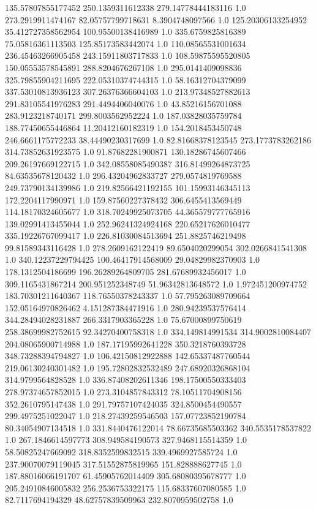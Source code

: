 135.57807855177452	250.1359311612338	279.14778444183116	1.0
273.2919911474167	82.05757799718631	8.3904748097566	1.0
125.20306133254952	35.412727358562954	100.95500138416989	1.0
335.6759825816389	75.05816361113503	125.85173583442074	1.0
110.08565531001634	236.45463266905458	243.15911803717833	1.0
108.59875595520805	150.05553578545891	288.8204676267108	1.0
295.0141409098836	325.79855904211695	222.05310374744315	1.0
58.16312704379099	337.53010813936123	307.26376366604103	1.0
213.97348527882613	291.83105541976283	291.4494406040076	1.0
43.85216156701088	283.9123218740171	299.8003562952224	1.0
187.03828035759784	188.77450655446864	11.20412160182319	1.0
154.2018453450748	246.6661175772233	38.44490230317699	1.0
82.81668378123545	273.1773783262186	314.73852631923575	1.0
91.87682281900871	130.18286745607466	209.26197669122715	1.0
342.08558085490387	316.81499264873725	84.63535678120432	1.0
296.43204962833727	279.0574819769588	249.73790134139986	1.0
219.82566421192155	101.15993146345113	172.2204117990971	1.0
159.87560227378432	306.6455413569449	114.18170324605677	1.0
318.70249925073705	44.365579777765916	139.02991413455044	1.0
252.96241324924168	220.65217626010477	335.19226767099417	1.0
226.81030084513694	251.8825746219498	99.81589343116428	1.0
278.2609162122419	89.6504020299054	302.0266841541308	1.0
340.12237229794425	100.46417914568009	29.04829982370903	1.0
178.1312504186699	196.26289264809705	281.67689932456017	1.0
309.1165431867214	200.951252348749	51.96342813648572	1.0
1.972451200974752	183.70301211640367	118.76550378243337	1.0
57.795263089709664	152.05164970826462	4.151287384471916	1.0
280.94239537576414	344.28494028231887	266.3317903365228	1.0
75.67000899750619	258.38699982752615	92.34270400758318	1.0
334.149814991534	314.9002810084407	204.08065900714988	1.0
187.17195992641228	350.3218760393728	348.73288394794827	1.0
106.42150812922888	142.65337487760544	219.06130240301482	1.0
195.72802832532489	247.68920326868104	314.9799564828528	1.0
336.87408202611346	198.17500550333403	278.97374657852015	1.0
273.3104857843312	78.10511704908156	352.2610795147438	1.0
291.79757107424035	324.8500454490557	299.4975251022047	1.0
218.27439259546503	157.07723852190784	80.34054907134518	1.0
331.8440476122014	78.66735685503362	340.5535178537822	1.0
267.1846614597773	308.949584190573	327.9468115514359	1.0
58.50825247669092	318.8352599832515	339.4969927585724	1.0
237.90070079119045	317.51552875819965	151.828888627745	1.0
187.88016066191707	61.45905762014409	305.68080395678777	1.0
205.24910846005832	256.2536753322175	115.68337607080585	1.0
82.7117694194329	48.62757839509963	232.8070959502758	1.0
